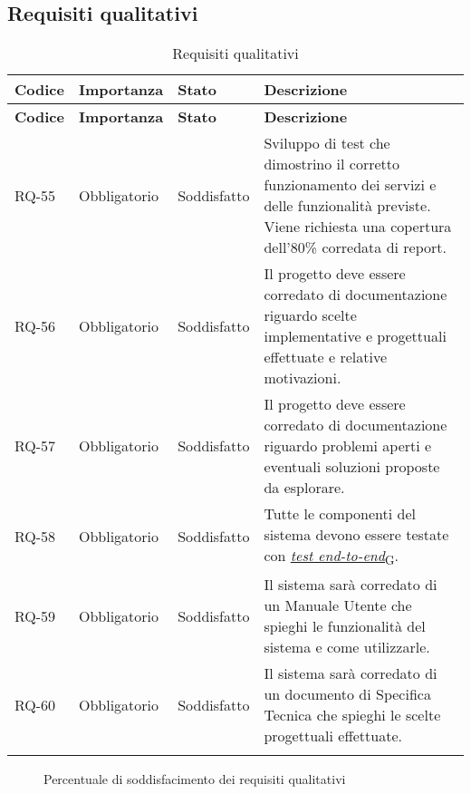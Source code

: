 \subsection{Requisiti qualitativi}
\begin{longtable}{|>{\centering\arraybackslash}m{}|>{\centering\arraybackslash}m{}|>{\centering\arraybackslash}m{}|>{\centering\arraybackslash}m{}|}
	\hline
	\textbf{Codice} & \textbf{Importanza} & \textbf{Stato}& \textbf{Descrizione}\\\hline
	\endfirsthead
	\hline
	\textbf{Codice} & \textbf{Importanza} & \textbf{Stato}& \textbf{Descrizione}\\\hline
	\endhead
	\hline
	RQ-55           & Obbligatorio        & Soddisfatto & Sviluppo di test che dimostrino il corretto funzionamento dei servizi e delle funzionalità previste. Viene richiesta una copertura dell'80\% corredata di report.
	\\\hline
	RQ-56           & Obbligatorio        & Soddisfatto & Il progetto deve essere corredato di documentazione riguardo scelte implementative e progettuali effettuate e relative motivazioni.
	\\\hline
	RQ-57           & Obbligatorio        & Soddisfatto & Il progetto deve essere corredato di documentazione riguardo problemi aperti e eventuali soluzioni proposte da esplorare.
	\\\hline
	RQ-58           & Obbligatorio        & Soddisfatto & Tutte le componenti del sistema devono essere testate con \href{https://7last.github.io/docs/pb/documentazione-interna/glossario\#test-end-to-end}{\textit{test end-to-end}\textsubscript{G}}.
	\\\hline
	RQ-59           & Obbligatorio        & Soddisfatto & Il sistema sarà corredato di un Manuale Utente che spieghi le funzionalità del sistema e come utilizzarle.
	\\\hline
	RQ-60           & Obbligatorio        & Soddisfatto & Il sistema sarà corredato di un documento di Specifica Tecnica che spieghi le scelte progettuali effettuate.
	\\\hline
	\caption{Requisiti qualitativi}
\end{longtable}

\begin{figure}[!h]
	\centering
	\caption{Percentuale di soddisfacimento dei requisiti qualitativi}
\end{figure}

